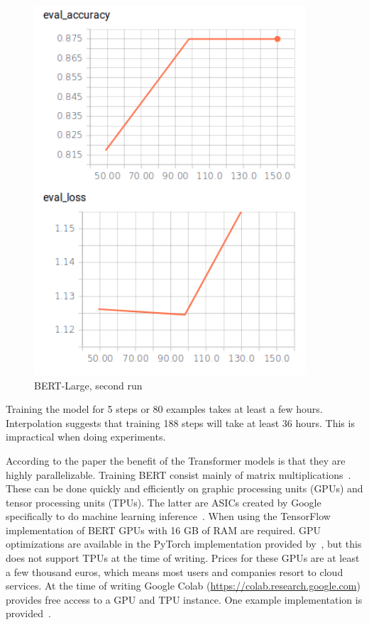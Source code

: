 \begin{figure}
\begin{minipage}{0.30\textwidth}
        \includegraphics[width=0.9\textwidth]{figures/tensorboard_askubuntu_large_2.png}
        \caption{BERT-Large, second run}
        \label{fig:tensorboard_large_2}
    \end{minipage}

\end{figure}
Training the model for 5 steps or 80 examples takes at least a few hours.
Interpolation suggests that training 188 steps will take at least 36 hours.
This is impractical when doing experiments.

According to the paper the benefit of the Transformer models is that they are highly parallelizable.
Training BERT consist mainly of matrix multiplications~\citep{dettmers2018}.
These can be done quickly and efficiently on graphic processing units (GPUs) and tensor processing units (TPUs).
The latter are ASICs created by Google specifically to do machine learning inference~\citep{jouppi2017}.
When using the TensorFlow implementation of BERT GPUs with 16 GB of RAM are required.
GPU optimizations are available in the PyTorch implementation provided by~\citet{wolf2018}, but this does not support TPUs at the time of writing.
Prices for these GPUs are at least a few thousand euros, which means most users and companies resort to cloud services.
At the time of writing Google Colab (\url{https://colab.research.google.com}) provides free access to a GPU and TPU instance.
One example implementation is provided~\citep{bajaj2018}.

